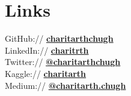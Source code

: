 \documentclass[]{resume-template}
\begin{document}
\begin{minipage}[t]{0.33\textwidth}
\section{Links}\label{sec:links}
GitHub:// \href{https://github.com/charitarthchugh}{\textbf {charitarthchugh}} \\
LinkedIn:// \href{https:///www.linkedin.com/in/charitarth}{\textbf {charitrth}} \\
Twitter:// \href{https://twitter.com/charitarthchugh}{\textbf{@charitarthchugh}}\\
Kaggle:// \href{https://kaggle.com/charitarth}{\textbf{charitarth}}\\
Medium:// \href{https://medium.com/@charitarth.chugh}{\textbf{@charitarth.chugh}}\\
%
%

\end{minipage} 
\hfill
\end{document}
